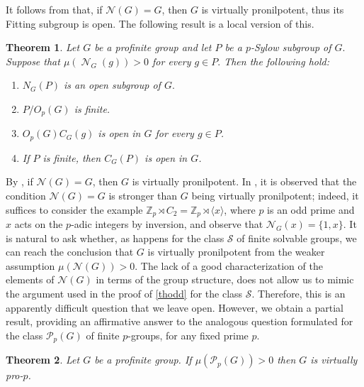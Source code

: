 \documentclass{amsart}
\DeclareMathOperator{\nil}{\mathcal N}
\newcommand{\la}{\langle}
\newcommand{\ra}{\rangle}
\newtheorem{thm}{Theorem}
\numberwithin{equation}{section}
\begin{document}
It follows from \cite[Theorem 1.3 (3)]{aemp} that, if $\mathcal N(G) = G$, then $G$ is virtually pronilpotent, thus its Fitting subgroup is open. The following result is a local version of this.

\begin{thm}\label{localnilp}
	Let $G$ be a  profinite group and let $P$ be a $p$-Sylow subgroup of $G.$  Suppose that $\mu(\nil_G(g))>0$ for every $g\in P.$
	Then the following hold:
	\begin{enumerate}
		\item $N_G(P)$ is an open subgroup of $G.$
		\item $P/O_p(G)$ is finite.
		\item $O_p(G)C_G(g)$ is open in $G$ for every $g \in P$.
		\item If $P$ is finite, then $C_G(P)$ is open in $G$.
	\end{enumerate}
\end{thm}

By \cite[Theorem 1.3]{aemp},  if $\mathcal N(G)=G$, then $G$ is virtually pronilpotent. In \cite{aemp}, it is observed that the condition $\mathcal N(G) = G$ is stronger than $G$ being virtually pronilpotent; indeed, it suffices to consider the example $\mathbb Z_p \rtimes C_2 = \mathbb Z_p \rtimes \la x \ra$, where $p$ is an odd prime and $x$ acts on the $p$-adic integers by inversion, and observe that $\mathcal N_G(x) = \{1,x\}$. It is natural to ask whether, as happens for the class $\mathcal S$ of finite solvable groups, we can reach the conclusion that $G$ is virtually pronilpotent from the  weaker assumption $\mu(\mathcal{N}(G)) > 0.$ The lack of a good characterization of the elements of $\mathcal N(G)$ in terms of the group structure, does not allow us to mimic the argument used in the proof of \cref{thodd} for the  class $\mathcal S$. Therefore, this is an apparently difficult question that we leave open. However, we obtain a partial result, providing an affirmative answer to the analogous question formulated for the class $\mathcal{P}_p(G)$ of finite $p$-groups, for any fixed prime $p.$

\begin{thm}\label{classp}
Let $G$ be a profinite group. If $\mu(\mathcal{P}_p(G)) > 0$ then $G$ is virtually pro-$p$.
\end{thm}


\end{document}
